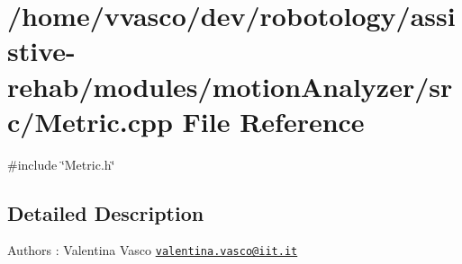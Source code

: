 \section{/home/vvasco/dev/robotology/assistive-\/rehab/modules/motion\+Analyzer/src/\+Metric.cpp File Reference}
\label{Metric_8cpp}
{\ttfamily \#include \char`\"{}Metric.\+h\char`\"{}}\newline


\subsection{Detailed Description}
\begin{DoxyAuthor}{Authors}
\+: Valentina Vasco \href{mailto:valentina.vasco@iit.it}{\tt valentina.\+vasco@iit.\+it} 
\end{DoxyAuthor}
